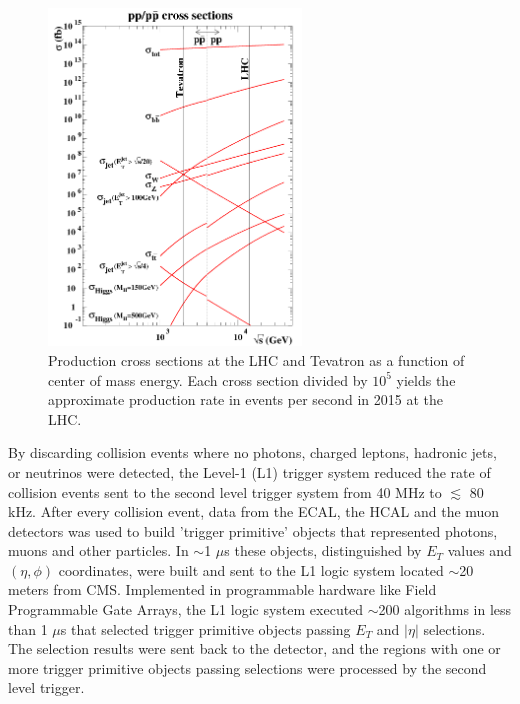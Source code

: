 \begin{figure}[h]
	\centering
	\includegraphics[width=0.6\textwidth]{figures/lhc_and_tevatron_cross_sections_2006.png}
	\caption{Production cross sections at the LHC and Tevatron as a function of center of mass energy.  Each cross section divided by $10^{5}$ yields 
	the approximate production rate in events per second in 2015 at the LHC.}
	\label{fig:smProductionXsxns}
\end{figure}

By discarding collision events where no photons, charged leptons, hadronic jets, or neutrinos were 
detected, the Level-1 (L1) trigger system reduced the rate of collision events sent to the second 
level trigger system from 40 MHz to $\lesssim$ 80 kHz.  After every collision event, data from 
the ECAL, the HCAL and the muon detectors was used to build 'trigger 
primitive' objects that represented photons, muons and other particles.  In $\sim$1 $\mu$s these objects, 
distinguished by $E_{T}$ values and $(\eta, \phi)$ coordinates, were built and sent to the L1 logic system located 
$\sim$20 meters from CMS.  Implemented in programmable hardware like Field Programmable Gate Arrays, the L1 
logic system executed $\sim$200 algorithms in less than 1 $\mu$s that selected trigger primitive objects passing $E_{T}$ 
and $|\eta|$ selections.  The selection results were sent back to the detector, and the regions with one 
or more trigger primitive objects passing selections were processed by the second level trigger.

